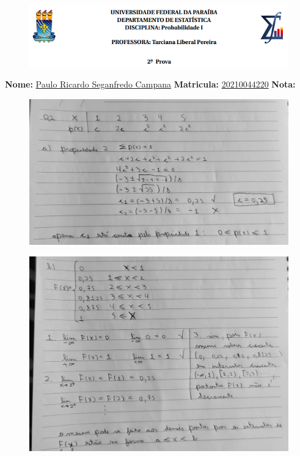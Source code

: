 \documentclass[12pt]{article}
\begin{document}
	
	\begin{figure}[h!]
		\includegraphics[scale=1]{ufpbde}
	\end{figure}
\par \textbf{Nome:} \underline{Paulo Ricardo Seganfredo Campana} \hspace{+12pt} \textbf{Matricula:} \underline{20210044220} \hspace{+12pt} \textbf{Nota:} 

\vspace{+12pt}

	\begin{figure}[h!]
		\includegraphics[scale=0.4]{q2a}
	\end{figure}
\vspace{+12pt}

	\begin{figure}[h!]
		\includegraphics[scale=0.4]{q2b}
	\end{figure}
\vspace{+12pt}
\end{document}
